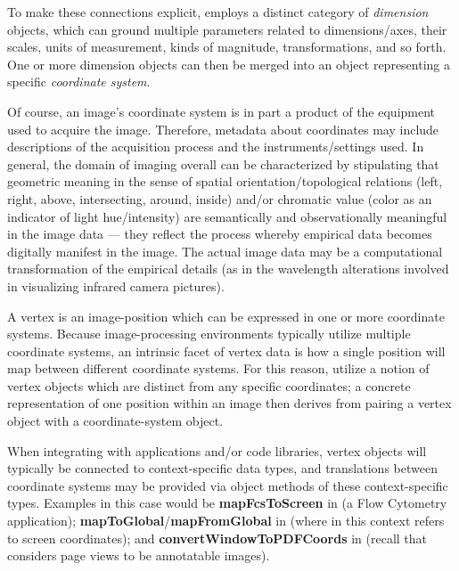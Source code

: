 {\begin{description}
To make these connections explicit, \AXFI{} 
employs a distinct category of \textit{dimension} 
objects, which can ground multiple parameters 
related to dimensions/axes, their scales, units 
of measurement, kinds of magnitude, transformations, 
and so forth.  One or more dimension objects 
can then be merged into an object representing 
a specific \textit{coordinate system}.

\label{ph:acquisition}Of course, an image's 
coordinate system is in part 
a product of the equipment used to acquire the 
image.  Therefore, metadata about coordinates 
may include descriptions of the 
acquisition process and the 
instruments/settings used.  In general, 
the domain of imaging overall can be 
characterized by stipulating that 
geometric meaning in the sense of spatial 
orientation/topological relations (left, right, above, 
intersecting, around, inside) and/or chromatic 
value (color as an indicator of light hue/intensity) 
are semantically and observationally meaningful 
in the image data --- they reflect the 
process whereby empirical data becomes digitally 
manifest in the image.  The actual image data 
may be a computational transformation of the 
empirical details (as in the wavelength alterations 
involved in visualizing infrared camera pictures).

\item[Vertices]  A vertex is an image-position which 
can be expressed in one or more coordinate systems.  
Because image-processing environments typically 
utilize multiple coordinate systems, an 
intrinsic facet of vertex data is how 
a single position will map between different 
coordinate systems.  For this reason, \AXFI{} 
utilize a notion of vertex objects which are 
distinct from any specific coordinates; 
a concrete representation of one position 
within an image then derives from 
pairing a vertex object with a coordinate-system 
object.  

When integrating with applications and/or code 
libraries, \AXFI{} vertex objects will typically 
be connected to context-specific data types, 
and translations between coordinate systems 
may be provided via object methods of 
these context-specific types.  Examples 
in this case would be \textbf{mapFcsToScreen} in 
\FACSanadu{} (a Flow Cytometry application);  
\textbf{mapToGlobal}/\textbf{mapFromGlobal} 
in \Qt{} (where  in this context 
refers to screen coordinates); and 
\textbf{convertWindowToPDFCoords} in \XPDF{} 
(recall that \AXFI{} considers \PDF{} page 
views to be annotatable images).


\end{description}}
